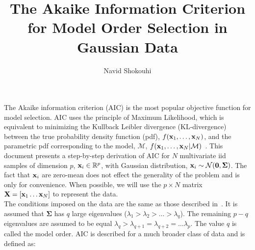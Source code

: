 \documentclass[10pt,technote,peerreview]{IEEEtran}
\newcommand{\R}{\mathbb{R}}
\newcommand{\bSigma}{\boldsymbol{\Sigma}}
\newcommand{\mM}{\mathcal{M}}
\begin{document}
\title{The Akaike Information Criterion for Model Order Selection in Gaussian Data}
\author{Navid Shokouhi}
\maketitle

\label{appendix}
The Akaike information criterion (AIC) is the most popular objective function for model selection. AIC uses the principle of Maximum Likelihood, which is equivalent to minimizing the Kullback Leibler divergence (KL-divergence) between the true probability density function (pdf), $f({\bf x}_1,\dots,{\bf x}_N)$, and the parametric pdf corresponding to the model, $\mM$, $f({\bf x}_1,\dots,{\bf x}_N|\mM)$~\cite{akaike1998information}. This document presents a step-by-step derivation of AIC for $N$ multivariate iid samples of dimension $p$, ${\bf x}_i\in\R^p$, with Gaussian distribution, ${\bf x}_i\sim\mathcal{N}({\bf 0},\bSigma)$. The fact that ${\bf x}_i$ are zero-mean does not effect the generality of the problem and is only for convenience. When possible, we will use the $p\times N$ matrix ${\bf X} = \left[{\bf x}_1\dots{\bf x}_N\right]$ to represent the data.
\\

The conditions imposed on the data are the same as those described in~\cite{waxandkailath1985}. It is assumed that $\bSigma$ has $q$ large eigenvalues ($\lambda_1>\lambda_2>\dots>\lambda_q$). The remaining $p-q$ eigenvalues are assumed to be equal $\lambda_q > \lambda_{q+1}=\lambda_{q+2}=\dots\lambda_p$. The value $q$ is called the model order. AIC is described for a much broader class of data and is defined as: 
\end{document}
